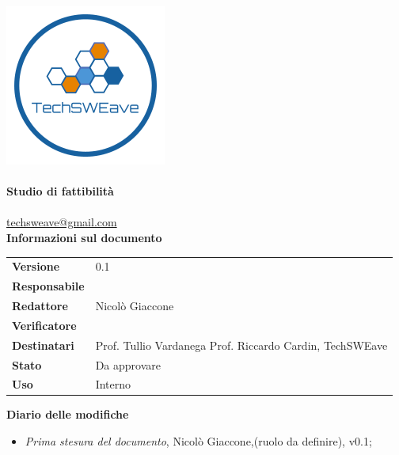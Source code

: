 \documentclass[a4paper]{article}
\begin{document}
\begin{titlepage}
    \begin{center}
        \includegraphics{../Images/logo}\\
        \vspace{20px}
        \textcolor{logo}{\hrulefill}\\
        \vspace{20px}
        \textbf{\huge\textcolor{logo}{Studio di fattibilità}}\\
        \vspace{10px}
        \textcolor{logo}{\hrulefill}\\
        \vspace{20px}
        \href{mailto:techsweave@gmail.com}{techsweave@gmail.com}\\
        \vspace{40px}
        \textbf{Informazioni sul documento}\\
        \vspace{20px}
        \begin{tabular}{p{100px} | p{100px}}
            \textbf{Versione} & 0.1\\
            \textbf{Responsabile} & \\
            \textbf{Redattore} & Nicolò Giaccone\\
            \textbf{Verificatore} & \\
            \textbf{Destinatari} & Prof. Tullio Vardanega \newline Prof. Riccardo Cardin, \newline TechSWEave\\
            \textbf{Stato} & Da approvare\\
            \textbf{Uso} & Interno\\
        \end{tabular}
            \vspace{1ex}

    \end{center}
    \end{titlepage}
    \begin{center}
       \textbf{Diario delle modifiche}
        \begin{itemize}
            \item \textit{Prima stesura del documento}, Nicolò Giaccone,(ruolo da definire), v0.1;
        \end{itemize}
    \end{center}
    \newpage
\tableofcontents
\newpage
\end{document}
